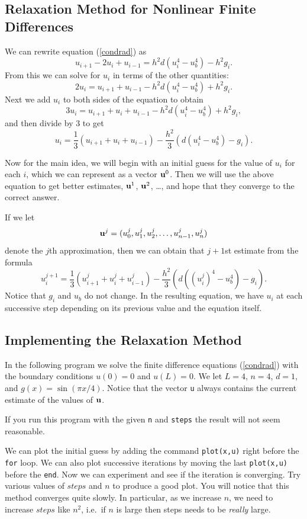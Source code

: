 
\subsection*{Relaxation Method for Nonlinear
                           Finite Differences}

We can rewrite equation (\ref{condrad}) as
$$
u_{i+1} - 2 u_i + u_{i-1} = h^2 d(u_i^4 - u_b^4) - h^2 g_i.
$$
From this we can solve for $u_i$ in terms of the other quantities:
$$
 2 u_i  = u_{i+1} + u_{i-1} - h^2 d(u_i^4 - u_b^4) + h^2 g_i.
$$
Next we add $u_i$ to both sides of the
equation to obtain
$$
 3 u_i  = u_{i+1} + u_i + u_{i-1} - h^2 d(u_i^4 - u_b^4) + h^2 g_i,
$$
and then divide by 3 to get
$$
u_i = \frac{1}{3} \left( u_{i+1} + u_i +  u_{i-1} \right)
     - \frac{h^2}{3} \left( d(u_i^4 - u_b^4) -  g_i \right).
$$

Now for the main idea, we will begin with an initial guess for the
value of $u_i$ for each $i$, which we can represent as a vector
$\mathbf{u}^0$. Then we will use the above equation to get better
estimates, $\mathbf{u}^1$, $\mathbf{u}^2$, \ldots, and hope that they converge
to the correct answer.

If we let
$$
\mathbf{u}^j = (u_0^j, u_1^j, u_2^j, \ldots, u_{n-1}^j, u_n^j)
$$
denote the $j$th approximation, then we can obtain that $j+1$st estimate
from the formula
$$
 u^{j+1}_i = \frac{1}{3} \left( u^j_{i+1} + u^j_i + u^j_{i-1} \right)
    - \frac{h^2}{3} \left( d((u^j_i)^4 - u_b^4) -  g_i \right).
$$
Notice that $g_i$ and $u_b$ do not change.
In the  resulting equation, we have $u_i$ at each successive step depending
on its previous value and the equation itself.


\subsection*{Implementing the Relaxation Method}

In the following program we solve the finite difference equations
(\ref{condrad}) with the boundary conditions $u(0) = 0$ and $u(L) = 0$.
We let $L = 4$, $n=4$, $d = 1$, and $g(x) = \sin(\pi x/4)$.
Notice that the vector \verb&u& always contains the current estimate of
the values of $\mathbf{u}$.

If you run this program with the given \verb&n& and \verb&steps& the
result will not seem reasonable.

We can plot the initial guess by adding the command \verb&plot(x,u)&
right before the \verb&for& loop. We can also plot successive
iterations by moving the last \verb&plot(x,u)& before the
\verb&end&. Now we can experiment and see if the iteration is
converging. Try various values of $steps$ and $n$ to produce a good
plot. You will notice that this method converges quite slowly. In
particular, as we increase $n$, we need to increase $steps$ like
$n^2$, i.e.~if $n$ is large then steps needs to be {\em really} large.


